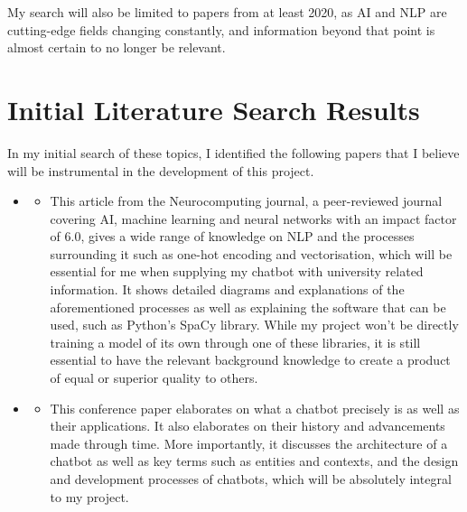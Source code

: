 \documentclass[12pt]{report}
\begin{document}
    \noindent My search will also be limited to papers from at least 2020, as AI and NLP are cutting-edge fields changing
    constantly, and information beyond that point is almost certain to no longer be relevant.

    \pagebreak 

    \section{Initial Literature Search Results}
    In my initial search of these topics, I identified the following papers that I believe will be instrumental
    in the development of this project.

    \begin{itemize}
        \item {} 
        \begin{itemize}
            \item This article from the Neurocomputing journal, a peer-reviewed journal covering AI, machine learning
            and neural networks with an impact factor of 6.0, gives a wide range of knowledge on NLP and the processes
            surrounding it such as one-hot encoding and vectorisation, which will be essential for me when 
            supplying my chatbot with university related information. It shows detailed diagrams and explanations of
            the aforementioned processes as well as explaining the software that can be used, such as Python's 
            SpaCy library. While my project won't be directly training a model of its own through one of these 
            libraries, it is still essential to have the relevant background knowledge to create a product of equal
            or superior quality to others.
        \end{itemize}

        \item {}
        \begin{itemize}
            \item This conference paper elaborates on what a chatbot precisely is as well as their applications. It
            also elaborates on their history and advancements made through time. More importantly, it discusses the
            architecture of a chatbot as well as key terms such as entities and contexts, and the design and 
            development processes of chatbots, which will be absolutely integral to my project.
        \end{itemize}


\end{itemize}
\end{document}
